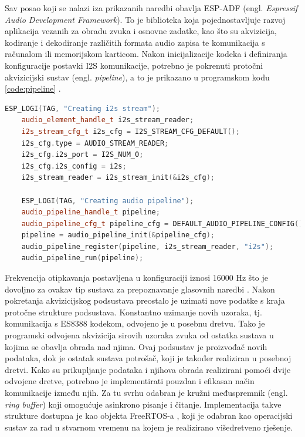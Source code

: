 Sav posao koji se nalazi iza prikazanih naredbi obavlja ESP-ADF
(engl. \textit{Espressif Audio Development Framework}). To je biblioteka koja pojednostavljuje
razvoj aplikacija vezanih za obradu zvuka i osnovne zadatke, kao što su akvizicija, kodiranje i 
dekodiranje različitih formata audio zapisa te komunikacija s računalom ili 
memorijskom karticom.
Nakon inicijalizacije kodeka i definiranja konfiguracije postavki I2S komunikacije,
potrebno je pokrenuti protočni akvizicijski sustav (engl. \textit{pipeline}), 
a to je prikazano u programskom kodu \ref{code:pipeline} .

\begin{lstlisting}[language={C++}, caption={Pokretanje akvizicijskog sustava}, label={code:pipeline}]
    ESP_LOGI(TAG, "Creating i2s stream");
    audio_element_handle_t i2s_stream_reader;
    i2s_stream_cfg_t i2s_cfg = I2S_STREAM_CFG_DEFAULT();
    i2s_cfg.type = AUDIO_STREAM_READER;
    i2s_cfg.i2s_port = I2S_NUM_0;
    i2s_cfg.i2s_config = i2s;
    i2s_stream_reader = i2s_stream_init(&i2s_cfg);

    ESP_LOGI(TAG, "Creating audio pipeline");
    audio_pipeline_handle_t pipeline;
    audio_pipeline_cfg_t pipeline_cfg = DEFAULT_AUDIO_PIPELINE_CONFIG();
    pipeline = audio_pipeline_init(&pipeline_cfg);
    audio_pipeline_register(pipeline, i2s_stream_reader, "i2s");
    audio_pipeline_run(pipeline);
\end{lstlisting}

Frekvencija otipkavanja postavljena u konfiguraciji iznosi 16000 Hz što
je dovoljno za ovakav tip sustava za prepoznavanje glasovnih naredbi \cite{wardentinyml}.
Nakon pokretanja akvizicijskog podsustava preostalo je uzimati nove
podatke s kraja protočne strukture podsustava. Konstantno uzimanje novih uzoraka, tj. komunikacija
s ES8388 kodekom, odvojeno je u posebnu dretvu. Tako je programski 
odvojena akvizicija sirovih uzoraka zvuka od ostatka sustava u kojima se obavlja obrada nad njima. Ovaj podsustav je proizvođač novih podataka, dok je ostatak sustava potrošač, koji je također realiziran u posebnoj dretvi. Kako su prikupljanje podataka i njihova obrada realizirani pomoći dvije odvojene dretve, potrebno je implementirati pouzdan i efikasan način komunikacije između njih. Za tu svrhu odabran je
kružni međuspremnik (engl. \textit{ring buffer}) koji omogućuje asinkrono pisanje i čitanje. Implementacija takve strukture dostupna je kao objekta FreeRTOS-a 
\cite{ringbufferrr}, koji je odabran kao operacijski sustav za rad u stvarnom vremenu na kojem je realizirano višedretveno rješenje. 



